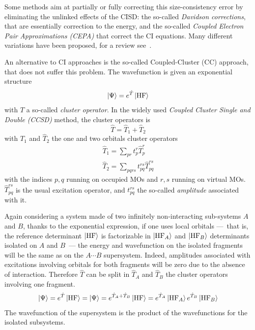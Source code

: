 \documentclass[./thesis.tex]{subfiles}
\begin{document}
Some methods aim at partially or fully correcting this size-consistency error by eliminating the unlinked effects of the CISD: the so-called \emph{Davidson corrections}, that are essentially correction to the energy\cite{Langhoff_1974,Meissner_1988}, and the so-called \emph{Coupled Electron Pair Approximations (CEPA)} that correct the CI equations\cite{Kelly_1963,Kelly_1964,Meyer_1971,Meyer_1973,Meyer_1974,Ahlrichs_1975}. Many different variations have been proposed, for a review see~\citep{Koch_1981}.

An alternative to CI approaches is the so-called Coupled-Cluster (CC) approach, that does not suffer this problem. The wavefunction is given an exponential structure
\begin{equation}
\ket \Psi = e^{\hat T} \ket {{\text{HF}}}
\end{equation}
with $\hat T$ a so-called \emph{cluster operator}. In the widely used \emph {Coupled Cluster Single and Double (CCSD)} method, the cluster operators is
\begin{equation}
\hat T = \hat T_1 + \hat T_2
\end{equation}
with $\hat T_1$ and $\hat T_2$ the one and two orbitals cluster operators 
\begin{align}
\hat T_1 = \sum_{pr} t_p^r \hat T_p^r \\
\hat T_2 = \sum_{pqrs} t_{pq}^{rs} \hat T_{pq}^{rs}
\end{align}
with the indices $p,q$ running on occupied MOs and $r,s$ running on virtual MOs. $\hat T_{pq}^{rs}$ is the usual excitation operator, and $t_{pq}^{rs}$ the so-called \emph{amplitude} associated with it.

Again considering a system made of two infinitely non-interacting sub-systems $A$ and $B$, thanks to the exponential expression, if one uses local orbitals ---~that is, the reference determinant $\ket {{\text{HF}}}$ is factorizable in $\ket{{\text{HF}}_A}$ and $\ket{{\text{HF}}_B}$ determinants isolated on $A$ and $B$~--- the energy and wavefunction on the isolated fragments will be the same as on the $A\cdots B$ supersystem.
Indeed, amplitudes associated with excitations involving orbitals for both fragments will be zero due to the absence of interaction. Therefore $\hat T$ can be split in $\hat T_A$ and $\hat T_B$ the cluster operators involving one fragment.
\begin{equation}
\ket \Psi = e^{\hat T} \ket {{\text{HF}}} = \ket \Psi = e^{\hat T_A + \hat T_B} \ket {{\text{HF}}} = e^{\hat T_A} \ket {{\text{HF}}_A} e^{\hat T_B} \ket {{\text{HF}}_B}
\end{equation}
The wavefunction of the supersystem is the product of the wavefunctions for the isolated subsystems.
\end{document}
